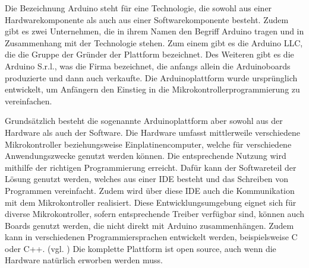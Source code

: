 Die Bezeichnung Arduino steht für eine Technologie, die sowohl aus einer Hardwarekomponente als auch aus einer Softwarekomponente besteht. Zudem gibt es zwei Unternehmen, die in ihrem Namen den Begriff Arduino tragen und in Zusammenhang mit der Technologie stehen. Zum einem gibt es die Arduino LLC, die die Gruppe der Gründer der Plattform bezeichnet. Des Weiteren gibt es die Arduino S.r.l., was die Firma bezeichnet, die anfangs allein die Arduinoboards produzierte und dann auch verkaufte. Die Arduinoplattform wurde ursprünglich entwickelt, um Anfängern den Einstieg in die Mikrokontrollerprogrammierung zu vereinfachen. 

Grundsätzlich besteht die sogenannte Arduinoplattform aber sowohl aus der Hardware als auch der Software. Die Hardware umfasst mittlerweile verschiedene Mikrokontroller beziehungsweise Einplatinencomputer, welche für verschiedene Anwendungszwecke genutzt werden können. Die entsprechende Nutzung wird mithilfe der richtigen Programmierung erreicht. Dafür kann der Softwareteil der Lösung genutzt werden, welches aus einer \ac{IDE}  besteht und das Schreiben von Programmen vereinfacht. Zudem wird über diese \ac{IDE} auch die Kommunikation mit dem Mikrokontroller realisiert. Diese Entwicklungsumgebung eignet sich für diverse Mikrokontroller, sofern entsprechende Treiber verfügbar sind, können auch Boards genutzt werden, die nicht direkt mit Arduino zusammenhängen. Zudem kann in verschiedenen Programmiersprachen entwickelt werden, beispielsweise C oder C++. (vgl. \cite{.h,.f,.e,.i,.g,online.})
Die komplette Plattform ist open source, auch wenn die Hardware natürlich erworben werden muss. 

